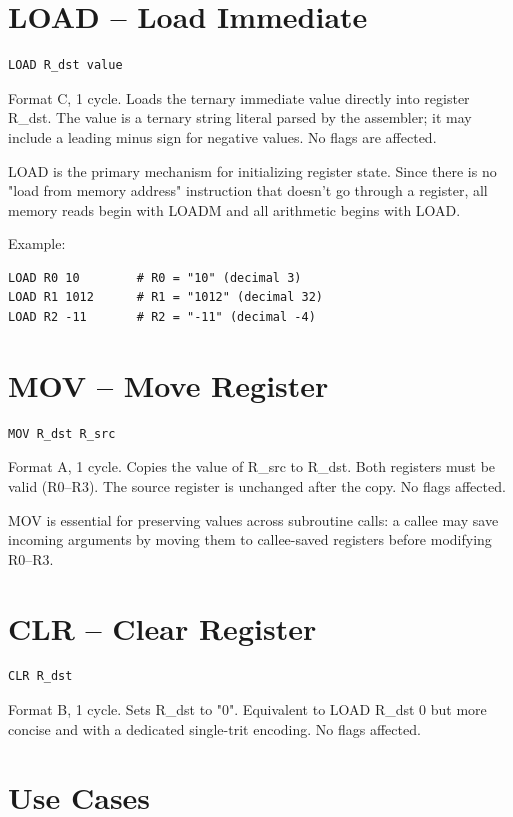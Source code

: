 \documentclass[12pt,a4paper,twoside]{book}
\theoremstyle{trinarytheorem}
\theoremstyle{trinarydefinition}
\newcommand{\code}[1]{\textsf{#1}}
\begin{document}
\section{LOAD -- Load Immediate}

\begin{verbatim}
LOAD R_dst value
\end{verbatim}
Format C, 1 cycle. Loads the ternary immediate \code{value} directly into register
\code{R\_dst}. The \code{value} is a ternary string literal parsed by the
assembler; it may include a leading minus sign for negative values. No flags are
affected.

\code{LOAD} is the primary mechanism for initializing register state. Since there is
no "load from memory address" instruction that doesn't go through a register, all
memory reads begin with \code{LOADM} and all arithmetic begins with \code{LOAD}.

Example:
\begin{lstlisting}
LOAD R0 10        # R0 = "10" (decimal 3)
LOAD R1 1012      # R1 = "1012" (decimal 32)
LOAD R2 -11       # R2 = "-11" (decimal -4)
\end{lstlisting}

\section{MOV -- Move Register}

\begin{verbatim}
MOV R_dst R_src
\end{verbatim}
Format A, 1 cycle. Copies the value of \code{R\_src} to \code{R\_dst}. Both
registers must be valid (R0--R3). The source register is unchanged after the copy.
No flags affected.

\code{MOV} is essential for preserving values across subroutine calls: a callee
may save incoming arguments by moving them to callee-saved registers before
modifying R0--R3.

\section{CLR -- Clear Register}

\begin{verbatim}
CLR R_dst
\end{verbatim}
Format B, 1 cycle. Sets \code{R\_dst} to \code{"0"}. Equivalent to
\code{LOAD R\_dst 0} but more concise and with a dedicated single-trit encoding.
No flags affected.

\section{Use Cases}
\end{document}
